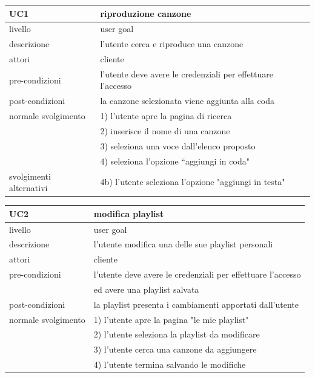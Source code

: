 \documentclass{article}
\begin{document}
\begin{center}
\begin{tabular}{|l|l|}
  \hline
  \textbf{UC1} & \textbf{riproduzione canzone}\\
  \hline
    livello & user goal\\
  \hline
    descrizione & l'utente cerca e riproduce una canzone\\
  \hline
    attori & cliente\\
  \hline
    pre-condizioni & l'utente deve avere le credenziali per effettuare l'accesso\\
  \hline
    post-condizioni & la canzone selezionata viene aggiunta alla coda\\
  \hline
  normale svolgimento & 1) l'utente apre la pagina di ricerca\\
                      & 2) inserisce il nome di una canzone\\
                      & 3) seleziona una voce dall'elenco proposto\\
                      & 4) seleziona l'opzione ``aggiungi in coda"
                        
  \\
  \hline
    svolgimenti alternativi & 4b) l'utente seleziona l'opzione "aggiungi in testa"\\
  \hline
  
\end{tabular}

\vspace{40pt}

\begin{tabular}{|l|l|}
  \hline
  \textbf{UC2} & \textbf{modifica playlist}\\
  \hline
    livello & user goal\\
  \hline
    descrizione & l'utente modifica una delle sue playlist personali\\
  \hline
    attori & cliente\\
  \hline
  pre-condizioni & l'utente deve avere le credenziali per effettuare l'accesso\\
  &ed avere una playlist salvata\\
  \hline
    post-condizioni & la playlist presenta i cambiamenti apportati dall'utente\\
  \hline
  normale svolgimento & 1) l'utente apre la pagina "le mie playlist"\\
                      & 2) l'utente seleziona la playlist da modificare\\
                      & 3) l'utente cerca una canzone da aggiungere\\
                      & 4) l'utente termina salvando le modifiche


\end{tabular}
\end{center}
\end{document}
